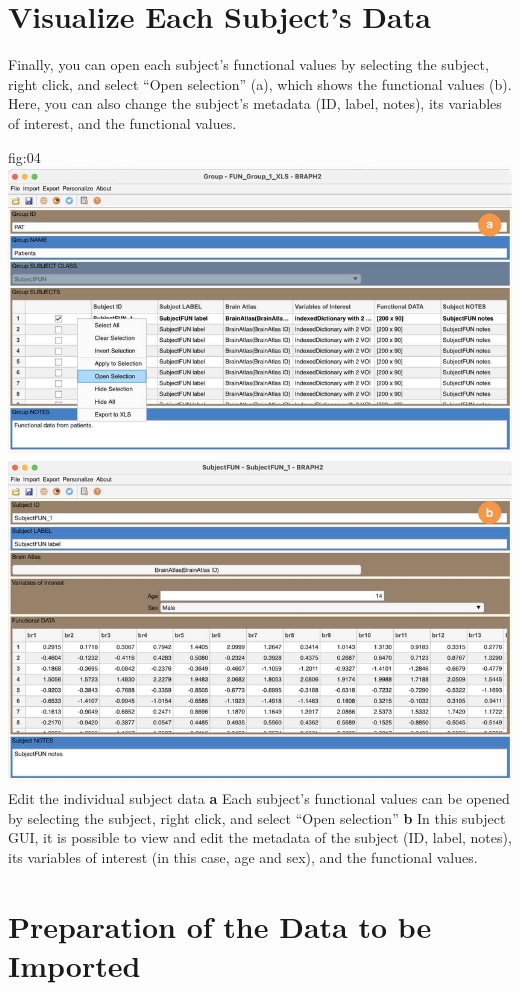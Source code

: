 \documentclass[justified]{tufte-handout}
\begin{document}
\section{Visualize Each Subject's Data}

Finally, you can open each subject's functional values by selecting the subject, right click, and select ``Open selection'' (a), which shows the functional values (b). Here, you can also change the subject's metadata (ID, label, notes), its variables of interest, and the functional values.

	{fig:04}
	{\includegraphics{fig04.jpg}
	}
	{Edit the individual subject data}
	{
	{\bf a} Each subject's functional values can be opened by selecting the subject, right click, and select ``Open selection''
	{\bf b} In this subject GUI, it is possible to view and edit the metadata of the subject (ID, label, notes), its variables of interest (in this case, age and sex), and the functional values. 
	}

\clearpage
\section{Preparation of the Data to be Imported}
\end{document}
